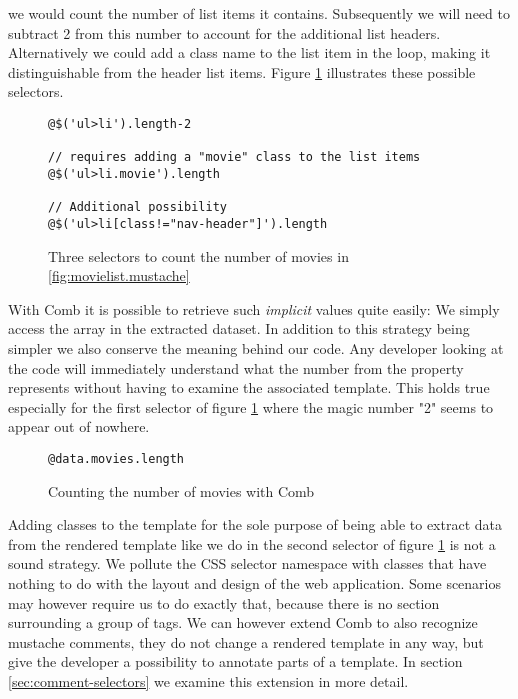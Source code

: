 \documentclass[thesis.tex]{subfiles}
\begin{document}
we would count the number of list items it contains. Subsequently we will need
to subtract 2 from this number to account for the additional list headers.
Alternatively we could add a class name to the list item in the
 loop, making it distinguishable from the header list
items.
Figure \ref{fig:movielist-jquery.js} illustrates these possible selectors.
\begin{figure}
	\centering
	\begin{lstlisting}
@$('ul>li').length-2

// requires adding a "movie" class to the list items
@$('ul>li.movie').length

// Additional possibility
@$('ul>li[class!="nav-header"]').length
	\end{lstlisting}
	\caption{Three selectors to count the number of movies in \ref{fig:movielist.mustache}}
	\label{fig:movielist-jquery.js}
\end{figure}

With Comb it is possible to retrieve such \emph{implicit} values quite easily:
We simply access the  array in the extracted dataset.
In addition to this strategy being simpler we also conserve the meaning behind
our code. Any developer looking at the code will immediately understand what
the number from the  property represents without having to
examine the associated template. This holds true especially for the first
selector of figure \ref{fig:movielist-jquery.js} where the magic number "2"
seems to appear out of nowhere.
\begin{figure}
	\centering
	\begin{lstlisting}
@data.movies.length
	\end{lstlisting}
	\caption{Counting the number of movies with Comb}
	\label{fig:movielist-comb.js}
\end{figure}
Adding classes to the template for the sole purpose of being able to extract
data from the rendered template like we do in the second selector of figure
\ref{fig:movielist-jquery.js} is not a sound strategy. We pollute the CSS
selector namespace with classes that have nothing to do with the layout and
design of the web application.
Some scenarios may however require us to do exactly that, because there is no
section surrounding a group of tags. We can however extend Comb to also
recognize mustache comments, they do not change a rendered template in any way,
but give the developer a possibility to annotate parts of a template. In section
\ref{sec:comment-selectors} we examine this extension in more detail.
\end{document}
